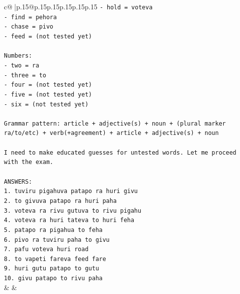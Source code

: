 \documentclass{article}
\begin{document}
{\begin{supertabular}{c@{$\;$}|p{.15\linewidth}@{}p{.15\linewidth}p{.15\linewidth}p{.15\linewidth}p{.15\linewidth}p{.15\linewidth}}
{{{\texttt{{-} hold = voteva} \\
\texttt{{-} find = pehora} \\
\texttt{{-} chase = pivo} \\
\texttt{{-} feed = (not tested yet)} \\
\\ 
\texttt{Numbers:} \\
\texttt{{-} two = ra} \\
\texttt{{-} three = to} \\
\texttt{{-} four = (not tested yet)} \\
\texttt{{-} five = (not tested yet)} \\
\texttt{{-} six = (not tested yet)} \\
\\ 
\texttt{Grammar pattern: article + adjective(s) + noun + (plural marker ra/to/etc) + verb(+agreement) + article + adjective(s) + noun} \\
\\ 
\texttt{I need to make educated guesses for untested words. Let me proceed with the exam.} \\
\\ 
\texttt{ANSWERS:} \\
\texttt{1. tuviru pigahuva patapo ra huri givu} \\
\texttt{2. to givuva patapo ra huri paha} \\
\texttt{3. voteva ra rivu gutuva to rivu pigahu} \\
\texttt{4. voteva ra huri tateva to huri feha} \\
\texttt{5. patapo ra pigahua to feha} \\
\texttt{6. pivo ra tuviru paha to givu} \\
\texttt{7. pafu voteva huri road} \\
\texttt{8. to vapeti fareva feed fare} \\
\texttt{9. huri gutu patapo to gutu} \\
\texttt{10. givu patapo to rivu paha} \\
            }
        }
    }
    & & \\ \\


\end{supertabular}}
\end{document}

